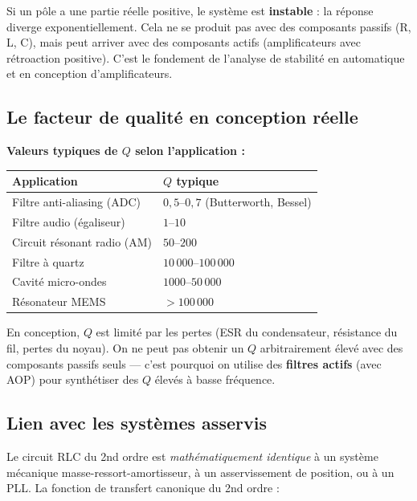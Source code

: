\documentclass[12pt,a4paper,twoside]{book}
\begin{document}
\begin{attention}
Si un pôle a une partie réelle positive, le système est \textbf{instable} : la réponse diverge exponentiellement. Cela ne se produit pas avec des composants passifs (R, L, C), mais peut arriver avec des composants actifs (amplificateurs avec rétroaction positive). C'est le fondement de l'analyse de stabilité en automatique et en conception d'amplificateurs.
\end{attention}

\subsection{Le facteur de qualité en conception réelle}

\begin{pratique}
\textbf{Valeurs typiques de $Q$ selon l'application :}
\begin{center}
\begin{tabular}{ll}
\toprule
\textbf{Application} & \textbf{$Q$ typique} \\
\midrule
Filtre anti-aliasing (ADC) & $0{,}5$--$0{,}7$ (Butterworth, Bessel) \\
Filtre audio (égaliseur) & $1$--$10$ \\
Circuit résonant radio (AM) & $50$--$200$ \\
Filtre à quartz & $10\,000$--$100\,000$ \\
Cavité micro-ondes & $1000$--$50\,000$ \\
Résonateur MEMS & $> 100\,000$ \\
\bottomrule
\end{tabular}
\end{center}
En conception, $Q$ est limité par les pertes (ESR du condensateur, résistance du fil, pertes du noyau). On ne peut pas obtenir un $Q$ arbitrairement élevé avec des composants passifs seuls --- c'est pourquoi on utilise des \textbf{filtres actifs} (avec AOP) pour synthétiser des $Q$ élevés à basse fréquence.
\end{pratique}

\subsection{Lien avec les systèmes asservis}

Le circuit RLC du 2nd ordre est \textit{mathématiquement identique} à un système mécanique masse-ressort-amortisseur, à un asservissement de position, ou à un PLL. La fonction de transfert canonique du 2nd ordre :
\end{document}
